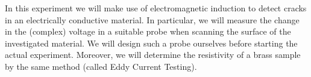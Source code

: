 







In this experiment we will make use of electromagnetic induction to detect cracks in an electrically conductive material. In particular, we will measure the change in the (complex) voltage in a suitable probe when scanning the surface of the investigated material. We will design such a probe ourselves before starting the actual experiment. Moreover, we will determine the resistivity of a brass sample by the same method (called Eddy Current Testing). 
